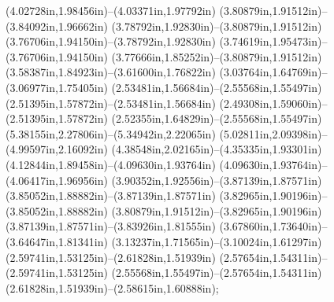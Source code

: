 (4.02728in,1.98456in)--(4.03371in,1.97792in) (3.80879in,1.91512in)--(3.84092in,1.96662in) (3.78792in,1.92830in)--(3.80879in,1.91512in) (3.76706in,1.94150in)--(3.78792in,1.92830in) (3.74619in,1.95473in)--(3.76706in,1.94150in) (3.77666in,1.85252in)--(3.80879in,1.91512in) (3.58387in,1.84923in)--(3.61600in,1.76822in) (3.03764in,1.64769in)--(3.06977in,1.75405in) (2.53481in,1.56684in)--(2.55568in,1.55497in) (2.51395in,1.57872in)--(2.53481in,1.56684in) (2.49308in,1.59060in)--(2.51395in,1.57872in) (2.52355in,1.64829in)--(2.55568in,1.55497in) (5.38155in,2.27806in)--(5.34942in,2.22065in) (5.02811in,2.09398in)--(4.99597in,2.16092in) (4.38548in,2.02165in)--(4.35335in,1.93301in) (4.12844in,1.89458in)--(4.09630in,1.93764in) (4.09630in,1.93764in)--(4.06417in,1.96956in) (3.90352in,1.92556in)--(3.87139in,1.87571in) (3.85052in,1.88882in)--(3.87139in,1.87571in) (3.82965in,1.90196in)--(3.85052in,1.88882in) (3.80879in,1.91512in)--(3.82965in,1.90196in) (3.87139in,1.87571in)--(3.83926in,1.81555in) (3.67860in,1.73640in)--(3.64647in,1.81341in) (3.13237in,1.71565in)--(3.10024in,1.61297in) (2.59741in,1.53125in)--(2.61828in,1.51939in) (2.57654in,1.54311in)--(2.59741in,1.53125in) (2.55568in,1.55497in)--(2.57654in,1.54311in) (2.61828in,1.51939in)--(2.58615in,1.60888in);
